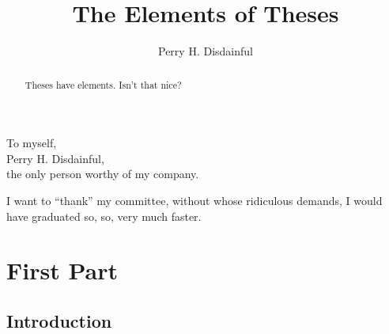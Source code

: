 \documentclass[11pt]{ucthesis}
\begin{document}

\title{The Elements of Theses}
\author{Perry H. Disdainful}

\maketitle
\approvalpage
\copyrightpage

\begin{abstract}
Theses have elements.  Isn't that nice?

\abstractsignature
\end{abstract}

\begin{frontmatter}

\begin{dedication}
\null\vfil
{\large
\begin{center}
To myself,\\\vspace{12pt}
Perry H. Disdainful,\\\vspace{12pt}
the only person worthy of my company.
\end{center}}
\vfil\null
\end{dedication}


\tableofcontents
\listoffigures
\listoftables
\begin{acknowledgements}
I want to ``thank'' my committee, without whose ridiculous demands, I
would have graduated so, so, very much faster.
\end{acknowledgements}

\end{frontmatter}

\part{First Part}

\chapter{Introduction}
\end{document}
